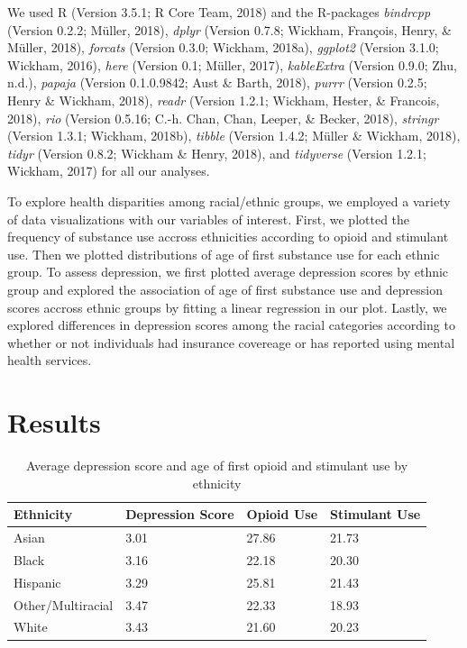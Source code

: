 \documentclass[man]{apa6}
\begin{document}
We used R (Version 3.5.1; R Core Team, 2018) and the R-packages
\emph{bindrcpp} (Version 0.2.2; Müller, 2018), \emph{dplyr} (Version
0.7.8; Wickham, François, Henry, \& Müller, 2018), \emph{forcats}
(Version 0.3.0; Wickham, 2018a), \emph{ggplot2} (Version 3.1.0; Wickham,
2016), \emph{here} (Version 0.1; Müller, 2017), \emph{kableExtra}
(Version 0.9.0; Zhu, n.d.), \emph{papaja} (Version 0.1.0.9842; Aust \&
Barth, 2018), \emph{purrr} (Version 0.2.5; Henry \& Wickham, 2018),
\emph{readr} (Version 1.2.1; Wickham, Hester, \& Francois, 2018),
\emph{rio} (Version 0.5.16; C.-h. Chan, Chan, Leeper, \& Becker, 2018),
\emph{stringr} (Version 1.3.1; Wickham, 2018b), \emph{tibble} (Version
1.4.2; Müller \& Wickham, 2018), \emph{tidyr} (Version 0.8.2; Wickham \&
Henry, 2018), and \emph{tidyverse} (Version 1.2.1; Wickham, 2017) for
all our analyses.

To explore health disparities among racial/ethnic groups, we employed a
variety of data visualizations with our variables of interest. First, we
plotted the frequency of substance use accross ethnicities according to
opioid and stimulant use. Then we plotted distributions of age of first
substance use for each ethnic group. To assess depression, we first
plotted average depression scores by ethnic group and explored the
association of age of first substance use and depression scores accross
ethnic groups by fitting a linear regression in our plot. Lastly, we
explored differences in depression scores among the racial categories
according to whether or not individuals had insurance covereage or has
reported using mental health services.

\section{Results}\label{results}

\begin{table}[tbp]
\begin{center}
\begin{threeparttable}
\caption{\label{tab:ST_table}Average depression score and age of first opioid and stimulant use by ethnicity}
\begin{tabular}{llll}
\toprule
Ethnicity & \multicolumn{1}{c}{Depression Score} & \multicolumn{1}{c}{Opioid Use} & \multicolumn{1}{c}{Stimulant Use}\\
\midrule
Asian & 3.01 & 27.86 & 21.73\\
Black & 3.16 & 22.18 & 20.30\\
Hispanic & 3.29 & 25.81 & 21.43\\
Other/Multiracial & 3.47 & 22.33 & 18.93\\
White & 3.43 & 21.60 & 20.23\\
\bottomrule
\end{tabular}
\end{threeparttable}
\end{center}
\end{table}
\end{document}
